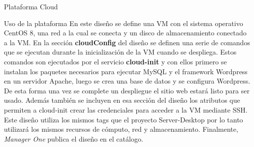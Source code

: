 \begin{subsection}{Plataforma Cloud}
\begin{subsubsection}{Uso de la plataforma}
        En este diseño se define una VM con el sistema operativo CentOS 8, una red a la cual se conecta y un disco de almacenamiento conectado a la VM. En la sección \textbf{cloudConfig} del diseño se definen una serie de comandos que se ejecutan durante la inicialización de la VM cuando se despliega. Estos comandos son ejecutados por el servicio \textbf{cloud-init} y con ellos primero se instalan los paquetes necesarios para ejecutar MySQL y el framework Wordpress en un servidor Apache, luego se crea una base de datos y se configura Wordpress. De esta forma una vez se complete un despliegue el sitio web estará listo para ser usado. Además también se incluyen en esa sección del diseño los atributos que permiten a cloud-init crear las credenciales para acceder a la VM mediante SSH. Este diseño utiliza los mismos tags que el proyecto Server-Desktop por lo tanto utilizará los mismos recursos de cómputo, red y almacenamiento. Finalmente, \textit{Manager One} publica el diseño en el catálogo.        
        

\end{subsubsection}
\end{subsection}
